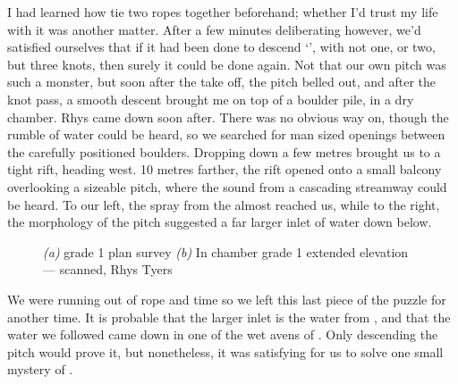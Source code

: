     I had learned how tie two ropes together beforehand; whether I'd trust my life with it was another matter. After a few minutes deliberating however, we'd satisfied ourselves that if it had been done to descend `', with not one, or two, but three knots, then surely it could be done again. Not that our own pitch was such a monster, but soon after the take off, the pitch belled out, and after the knot pass, a smooth descent brought me on top of a boulder pile, in a dry chamber. Rhys came down soon after. There was no obvious way on, though the rumble of water could be heard, so we searched for man sized openings between the carefully positioned boulders. Dropping down a few metres brought us to a tight rift, heading west. 10 metres farther, the rift opened onto a small balcony overlooking a sizeable pitch, where the sound from a cascading streamway could be heard. To our left, the spray from the  almost reached us, while to the right, the morphology of the pitch suggested a far larger inlet of water down below.

    \begin{figure}[t!]
        \checkoddpage \ifoddpage \forcerectofloat \else \forceversofloat \fi
        \centering
        \begin{subfigure}[t]{0.41\textwidth}
            \centering
            \caption{}\label{davyjones}
        \end{subfigure}
        \hfill
        \begin{subfigure}[t]{0.58\textwidth}
            \centering
            \caption{} \label{helmsdeep}
        \end{subfigure}

        \caption{
            \emph{(a)} \protect{} grade 1 plan survey
            \emph{(b)} In \protect{} chamber grade 1 extended elevation --- scanned, Rhys Tyers
        }
    \end{figure}


    We were running out of rope and time so we left this last piece of the puzzle for another time. It is probable that the larger inlet is the water from , and that the water we followed came down in one of the wet avens of . Only descending the pitch would prove it, but nonetheless, it was satisfying for us to solve one small mystery of . 
